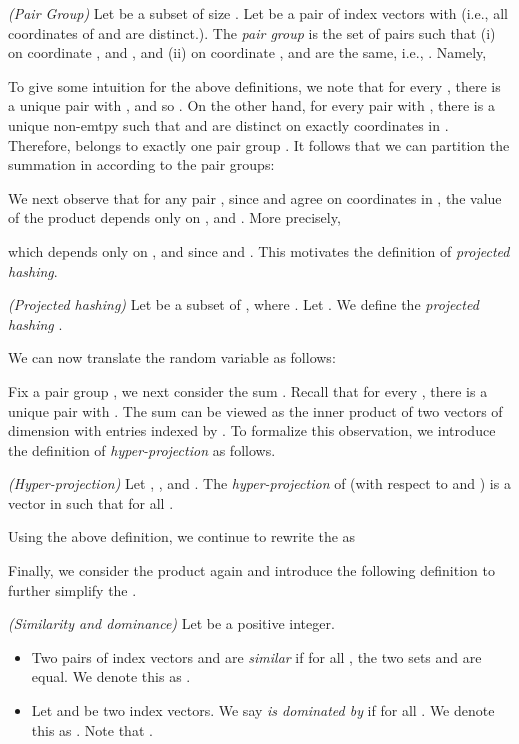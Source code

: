 \def\draft{0}  \documentclass[proceedings]{stacs}
\theoremstyle{plain}\newtheorem{satz}[thm]{Satz}
\theoremstyle{definition}\newtheorem{crucial}[thm]{Crucial Definition}
\begin{document}
\begin{definition}\label{def:pairs projection} \emph{(Pair Group)}
Let  be a subset of size . Let  be a pair of index vectors with  (i.e., all coordinates of  and  are distinct.). The \emph{pair group}  is the set of pairs  such that (i) on coordinate ,  and , and (ii) on coordinate ,  and  are the same, i.e., . Namely,

\end{definition}

To give some intuition for the above definitions, we note that for every , there is a unique pair  with , and so . On the other hand, for every pair  with , there is a unique non-emtpy  such that  and  are distinct on exactly coordinates in . Therefore,  belongs to exactly one pair group . It follows that we can partition the summation in  according to the pair groups:


We next observe that for any pair , since  and  agree on coordinates in , the value of the product  depends only on ,  and  . More precisely,

which depends only on ,  and   since   and . This motivates the definition of \emph{projected hashing}.

\begin{definition}\label{def:projectedhashing} \emph{(Projected hashing)}
Let  be a subset of , where .
Let . We define the \emph{projected hashing} .
\end{definition}
We can now translate the random variable  as follows:


Fix a pair group , we next consider the sum . Recall that for every , there is a unique pair  with . The sum can be viewed as the inner product of two vectors of dimension  with entries indexed by . To formalize this observation, we introduce the definition of \emph{hyper-projection} as follows.

\begin{definition}\label{def:hyperproj} \emph{(Hyper-projection)} Let , , and . The \emph{hyper-projection}  of  (with respect to  and ) is a vector  in  such that  for all .
\end{definition}

Using the above definition, we continue to rewrite the  as


Finally, we consider the product  again and introduce the following definition to further simplify  the .



\begin{definition}\label{def:similar pairs} \emph{(Similarity and dominance)}
Let  be a positive integer.
\begin{itemize}
\item Two pairs of index vectors  and  are \emph{similar} if for all , the two sets  and  are equal. We denote this as .

\item Let  and  be two index vectors. We say  \emph{is dominated by}  if  for all . We denote this as . Note that .
\end{itemize}
\end{definition}
\end{document}
